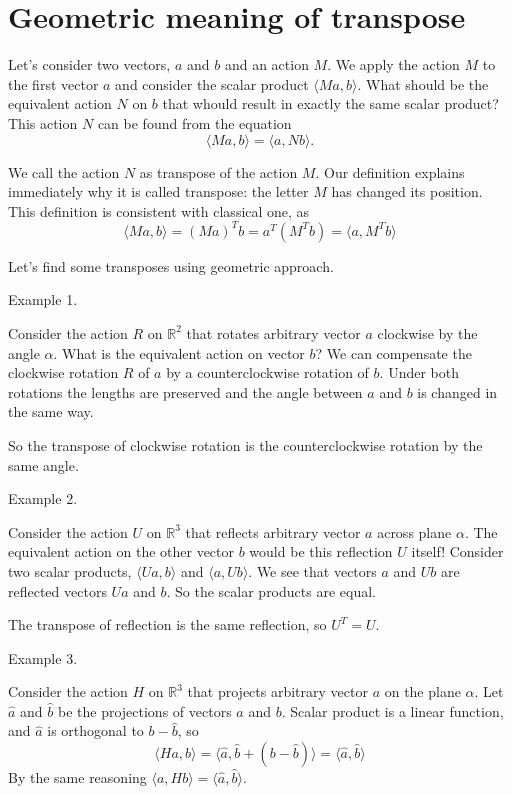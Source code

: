 \section{Geometric meaning of transpose}

Let's consider two vectors, $a$ and $b$ and an action $M$.
We apply the action $M$ to the first vector $a$ and
consider the scalar product $\langle Ma, b\rangle$.
What should be the equivalent action $N$ on $b$ that whould result
in exactly the same scalar product?
This action $N$ can be found from the equation
\[
\langle Ma, b \rangle = \langle a, Nb \rangle.
\]

We call the action $N$ as transpose of the action $M$.
Our definition explains immediately why it is called transpose:
the letter $M$ has changed its position.
This definition is consistent with classical one, as
\[
\langle Ma, b\rangle = (Ma)^T b = a^T (M^T b) = \langle a, M^T b \rangle
\]

Let's find some transposes using geometric approach.

Example 1.

Consider the action $R$ on $\mathbb{R}^2$ that rotates arbitrary vector $a$ clockwise by the angle $\alpha$.
What is the equivalent action on vector $b$? We can compensate the clockwise rotation $R$ of $a$
by a counterclockwise rotation of $b$. Under both rotations the lengths are preserved
and the angle between $a$ and $b$ is changed in the same way.

So the transpose of clockwise rotation is the counterclockwise rotation by the same angle.

Example 2.

Consider the action $U$ on $\mathbb{R}^3$ that reflects arbitrary vector $a$ across plane $\alpha$.
The equivalent action on the other vector $b$ would be this reflection $U$ itself!
Consider two scalar products, $\langle Ua, b \rangle$ and $\langle a, Ub \rangle$.
We see that vectors $a$ and $Ub$ are reflected vectors $Ua$ and $b$.
So the scalar products are equal.

The transpose of reflection is the same reflection, so $U^T=U$.

Example 3.


Consider the action $H$ on $\mathbb{R}^3$ that projects arbitrary vector $a$ on the plane $\alpha$.
Let $\hat a$ and $\hat b$ be the projections of vectors $a$ and $b$.
Scalar product is a linear function, and $\hat a$ is orthogonal to $b - \hat b$, so
\[
\langle Ha, b \rangle = \langle \hat a, \hat b + (b-\hat b) \rangle = \langle \hat a, \hat b \rangle
\]
By the same reasoning $\langle a, Hb \rangle = \langle \hat a, \hat b \rangle$.

